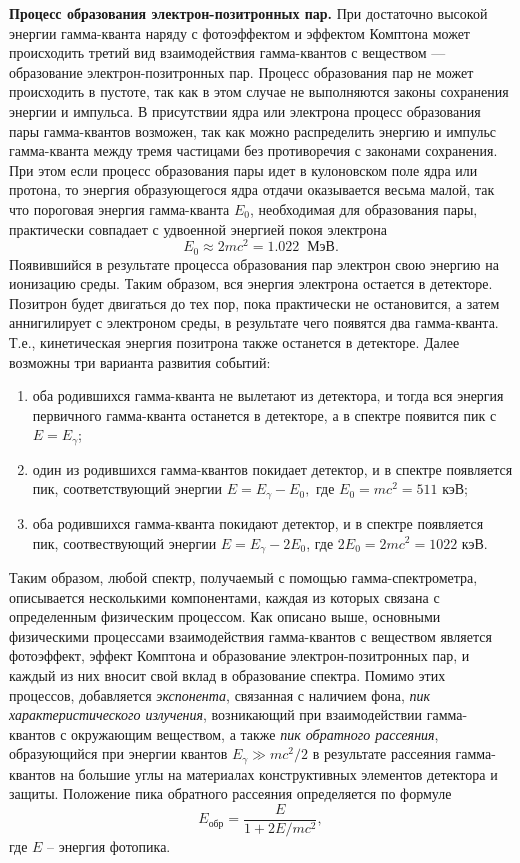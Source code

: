 \documentclass[a4paper]{article}
\begin{document}
\noindent\textbf{Процесс образования электрон-позитронных пар.} При достаточно высокой энергии гамма-кванта наряду с фотоэффектом и эффектом Комптона может происходить третий вид взаимодействия гамма-квантов с веществом --- образование электрон-позитронных пар. Процесс образования пар не может происходить в пустоте, так как в этом случае не выполняются законы сохранения энергии и импульса. В присутствии ядра или электрона процесс образования пары гамма-квантов возможен, так как можно распределить энергию и импульс гамма-кванта между тремя частицами без противоречия с законами сохранения. При этом если процесс образования пары идет в кулоновском поле ядра или протона, то энергия образующегося ядра отдачи оказывается весьма малой, так что пороговая энергия гамма-кванта $E_0$, необходимая для образования пары, практически совпадает с удвоенной энергией покоя электрона $$E_0 \approx 2mc^2=1.022 \;\; \text{МэВ}.$$ Появившийся в результате процесса образования пар электрон свою энергию на ионизацию среды. Таким образом, вся энергия электрона остается в детекторе. Позитрон будет двигаться до тех пор, пока практически не остановится, а затем аннигилирует с электроном среды, в результате чего появятся два гамма-кванта. Т.е., кинетическая энергия позитрона также останется в детекторе. Далее возможны три варианта развития событий:
\begin{enumerate}
\item оба родившихся гамма-кванта не вылетают из детектора, и тогда вся энергия первичного гамма-кванта останется в детекторе, а в спектре появится пик с $E=E_{\gamma}$;
\item один из родившихся гамма-квантов покидает детектор, и в спектре появляется пик, соответствующий энергии $E=E_{\gamma}-E_0,$ где $E_0=mc^2=511$ кэВ;
\item оба родившихся гамма-кванта покидают детектор, и в спектре появляется пик, соотвествующий энергии $E=E_{\gamma}-2E_0$, где $2E_0=2mc^2=1022$ кэВ.
\end{enumerate}
Таким образом, любой спектр, получаемый с помощью гамма-спектрометра, описывается несколькими компонентами, каждая из которых связана с определенным физическим процессом. Как описано выше, основными физическими процессами взаимодействия гамма-квантов с веществом является фотоэффект, эффект Комптона и образование электрон-позитронных пар, и каждый из них вносит свой вклад в образование спектра. Помимо этих процессов, добавляется \textit{экспонента}, связанная с наличием фона, \textit{пик характеристического излучения}, возникающий при взаимодействии гамма-квантов с окружающим веществом, а также \textit{пик обратного рассеяния}, образующийся при энергии квантов $E_{\gamma}\gg mc^2/2$ в результате рассеяния гамма-квантов на большие углы на материалах  конструктивных элементов детектора и защиты. Положение пика обратного рассеяния определяется по формуле 
\begin{equation}
    E_{\text{обр}}=\frac{E}{1+2E/mc^2},
\end{equation}
где $E$ -- энергия фотопика.
\end{document}
